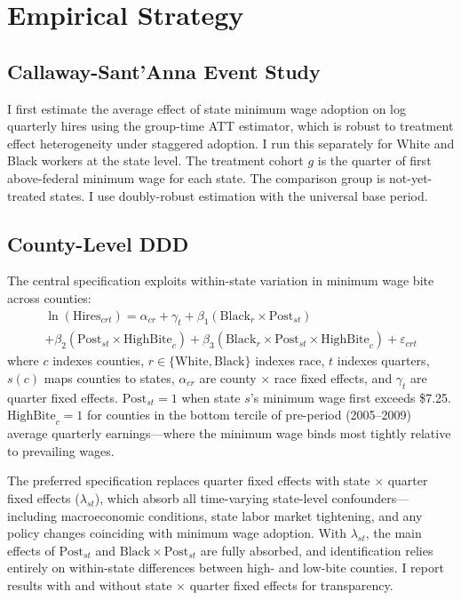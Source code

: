 \documentclass[12pt]{article}
\begin{document}
\section{Empirical Strategy}

\subsection{Callaway-Sant'Anna Event Study}

I first estimate the average effect of state minimum wage adoption on log quarterly hires using the \citet{callaway2021difference} group-time ATT estimator, which is robust to treatment effect heterogeneity under staggered adoption. I run this separately for White and Black workers at the state level. The treatment cohort $g$ is the quarter of first above-federal minimum wage for each state. The comparison group is not-yet-treated states. I use doubly-robust estimation with the universal base period.

\subsection{County-Level DDD}

The central specification exploits within-state variation in minimum wage bite across counties:
\begin{multline}
\ln(\text{Hires}_{crt}) = \alpha_{cr} + \gamma_t + \beta_1 (\text{Black}_r \times \text{Post}_{st}) \\
+ \beta_2 (\text{Post}_{st} \times \text{HighBite}_c) + \beta_3 (\text{Black}_r \times \text{Post}_{st} \times \text{HighBite}_c) + \varepsilon_{crt}
\label{eq:ddd}
\end{multline}
where $c$ indexes counties, $r \in \{\text{White}, \text{Black}\}$ indexes race, $t$ indexes quarters, $s(c)$ maps counties to states, $\alpha_{cr}$ are county $\times$ race fixed effects, and $\gamma_t$ are quarter fixed effects. $\text{Post}_{st} = 1$ when state $s$'s minimum wage first exceeds \$7.25. $\text{HighBite}_c = 1$ for counties in the bottom tercile of pre-period (2005--2009) average quarterly earnings---where the minimum wage binds most tightly relative to prevailing wages.

The preferred specification replaces quarter fixed effects with state $\times$ quarter fixed effects ($\lambda_{st}$), which absorb all time-varying state-level confounders---including macroeconomic conditions, state labor market tightening, and any policy changes coinciding with minimum wage adoption. With $\lambda_{st}$, the main effects of $\text{Post}_{st}$ and $\text{Black} \times \text{Post}_{st}$ are fully absorbed, and identification relies entirely on within-state differences between high- and low-bite counties. I report results with and without state $\times$ quarter fixed effects for transparency.
\end{document}

